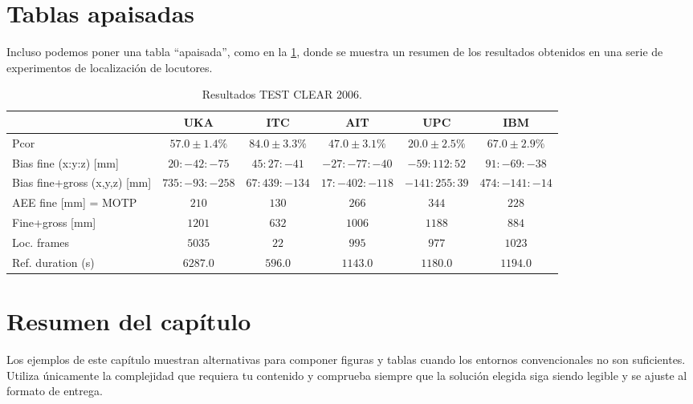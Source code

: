 



\section{Tablas apaisadas}
\label{sec:tablas-apaisadas}

Incluso podemos poner una tabla ``apaisada'', como en la \ref{tab:tablas2006}, donde se muestra un resumen de los resultados obtenidos en una serie de experimentos de localización de locutores.

\begin{table}
  \begin{center}
    \begin{tabular}{||l|c|c|c|c|c||}
      \hline \hline
      & UKA & ITC & AIT & UPC & IBM\\
      \hline
      \hline
      Pcor & $57.0\pm1.4\%$ & $84.0\pm3.3\%$ & $47.0\pm3.1\%$ & $20.0\pm2.5\%$ & $67.0\pm2.9\%$ \\
      \hline
      Bias fine (x:y:z) [mm] & $20:-42:-75$ & $45:27:-41$ & $-27:-77:-40$ & $-59:112:52$ & $91:-69:-38$ \\
      \hline
      Bias fine+gross (x,y,z) [mm] & $735:-93:-258$ & $67:439:-134$ & $17:-402:-118$ & $-141:255:39$ & $474:-141:-14$ \\
      \hline
      AEE fine [mm] = MOTP & $210$ & $130$ & $266$ & $344$ & $228$ \\
      \hline
      Fine+gross [mm] & $1201$ & $632$ & $1006$ & $1188$ & $884$ \\
      \hline
      Loc. frames & $5035$ & $22$ & $995$ & $977$ & $1023$ \\
      \hline
      Ref. duration (s) & $6287.0$ & $596.0$ & $1143.0$ & $1180.0$ & $1194.0$ \\
      \hline \hline
    \end{tabular}
    \caption{Resultados TEST CLEAR 2006.}
    \label{tab:tablas2006}
  \end{center}
\end{table}




\section{Resumen del capítulo}
\label{sec:resumen-ejemplos-avanzados}

Los ejemplos de este capítulo muestran alternativas para componer figuras y tablas cuando los entornos convencionales no son suficientes. Utiliza únicamente la complejidad que requiera tu contenido y comprueba siempre que la solución elegida siga siendo legible y se ajuste al formato de entrega.








